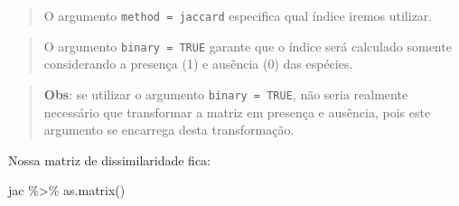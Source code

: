 \documentclass[
]{book}
\newenvironment{Shaded}{\begin{snugshade}}{\end{snugshade}}
\newcommand{\FunctionTok}[1]{\textcolor[rgb]{0.00,0.00,0.00}{#1}}
\newcommand{\NormalTok}[1]{#1}
\newcommand{\SpecialCharTok}[1]{\textcolor[rgb]{0.00,0.00,0.00}{#1}}
\begin{document}
\begin{quote}
O argumento \texttt{method\ =\ \textquotesingle{}jaccard\textquotesingle{}} especifica qual índice iremos utilizar.
\end{quote}

\begin{quote}
O argumento \texttt{binary\ =\ TRUE} garante que o índice será calculado somente considerando a presença (1) e ausência (0) das espécies.
\end{quote}

\begin{quote}
\textbf{Obs}: se utilizar o argumento \texttt{binary\ =\ TRUE}, não seria realmente necessário que transformar a matriz em presença e ausência, pois este argumento se encarrega desta transformação.
\end{quote}

Nossa matriz de dissimilaridade fica:

\begin{Shaded}
\begin{Highlighting}[]
\NormalTok{jac }\SpecialCharTok{\%\textgreater{}\%} \FunctionTok{as.matrix}\NormalTok{()}
\end{Highlighting}
\end{Shaded}
\end{document}
